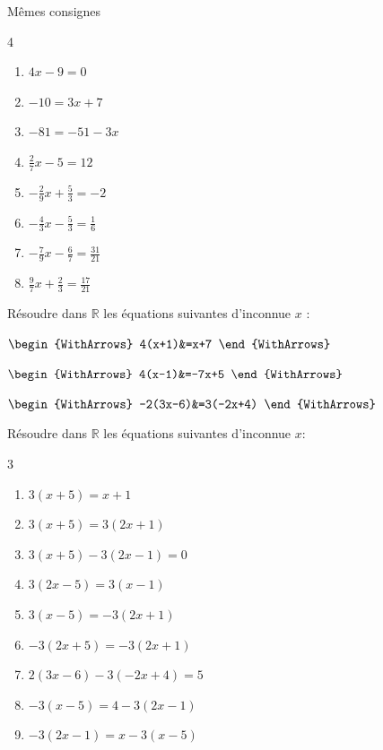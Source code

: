 \documentclass[main.tex]{subfiles}
\begin{document}
\begin{exercise}\label{chapter07:exercice:equation02}  Mêmes consignes \hfill 
	\vspace{-1em} 
	\begin{multicols}{4}
		\begin{enumerate}[label={$(E_{\arabic*})$}, leftmargin=*]
			\item $4x-9=0$
			\item $-10=3x+7$
			\item $-81=-51-3x$
			\item $\tfrac{2}{7}x -5=12$
			\item $-\tfrac{2}{9}x+\tfrac{5}{3}=-2$ 
			\item $-\tfrac{4}{3}x-\tfrac{5}{3}=\tfrac{1}{6}$ 
			\item $-\tfrac{7}{9}x-\tfrac{6}{7}=\tfrac{31}{21}$
			\item $\tfrac{9}{7}x+\tfrac{2}{3}=\tfrac{17}{21}$
		\end{enumerate}
	\end{multicols}  
\end{exercise}
\vspace{-1em}
\begin{example}  Résoudre dans $\mathbb{R}$ les équations suivantes d'inconnue $x$ :\hfill 
	
	\noindent \parbox{0.33\linewidth}{	
		$\begin{WithArrows}
			4(x+1)&=x+7   
		\end{WithArrows}$ 	
	}\hfill \parbox{0.33\linewidth}{	
		$\begin{WithArrows}
			4(x-1)&=-7x+5 
		\end{WithArrows}$ 
}\hfill \parbox{0.33\linewidth}{	
$\begin{WithArrows}
	-2(3x-6)&=3(-2x+4)    
\end{WithArrows}$ 
} 
\vfill    
\end{example} 
\begin{exercise}\label{chapter07:exercice:equationA} Résoudre dans $\mathbb{R}$ les équations suivantes d'inconnue $x$: \hfill 
	\vspace{-1em}
	\begin{multicols}{3}
		\begin{enumerate}[label={$(E_{\arabic*})$}, leftmargin=*]
			\item $3(x+5)=x+1$
			\item $3(x+5)=3(2x+1)$
			\item $3(x+5)-3(2x-1)=0$
			\item $3(2x-5)=3(x-1)$
			\item $3(x-5)=-3(2x+1)$ 
			\item $-3(2x+5)=-3(2x+1)$
			\item $2(3x-6)-3(-2x+4)=5$
			\item $-3(x-5)=4-3(2x-1)$
			\item $-3(2x-1)=x-3(x-5)$ 
		\end{enumerate}
	\end{multicols} 	
\end{exercise}
\end{document}
